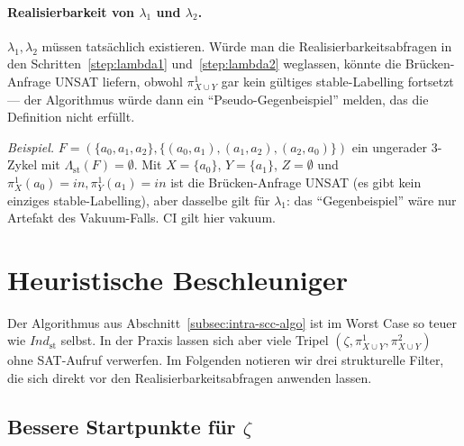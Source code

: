 \paragraph{Realisierbarkeit von \texorpdfstring{\(\lambda_1\)}{lambda_1} und \texorpdfstring{\(\lambda_2\)}{lambda_2}.}
\(\lambda_1, \lambda_2\) müssen tatsächlich existieren. Würde man die
Realisierbarkeitsabfragen in den Schritten~\ref{step:lambda1}
und~\ref{step:lambda2} weglassen, könnte die Brücken-Anfrage UNSAT
liefern, obwohl \(\pi^1_{X\cup Y}\) gar kein gültiges stable-Labelling
fortsetzt --- der Algorithmus würde dann ein ``Pseudo-Gegenbeispiel''
melden, das die Definition nicht erfüllt.

\emph{Beispiel.} \(F=(\{a_0, a_1, a_2\}, \{(a_0, a_1), (a_1, a_2),
(a_2, a_0)\})\) ein ungerader 3-Zykel mit
\(\varLambda_{\mathrm{st}}(F) = \emptyset\). Mit \(X=\{a_0\}\),
\(Y=\{a_1\}\), \(Z=\emptyset\) und \(\pi^1_X(a_0) = \mathit{in},
\pi^1_Y(a_1) = \mathit{in}\) ist die Brücken-Anfrage UNSAT (es gibt
kein einziges stable-Labelling), aber dasselbe gilt für \(\lambda_1\):
das ``Gegenbeispiel'' wäre nur Artefakt des Vakuum-Falls. CI gilt hier
vakuum.

\section{Heuristische Beschleuniger}
\label{sec:intra-scc-heur}

Der Algorithmus aus Abschnitt~\ref{subsec:intra-scc-algo} ist im
Worst Case so teuer wie \(\textit{Ind}_{\mathrm{st}}\) selbst. In der
Praxis lassen sich aber viele Tripel
\((\zeta, \pi^1_{X\cup Y}, \pi^2_{X\cup Y})\) ohne SAT-Aufruf
verwerfen. Im Folgenden notieren wir drei strukturelle Filter, die
sich direkt vor den Realisierbarkeitsabfragen anwenden lassen.

\subsection{Bessere Startpunkte für \texorpdfstring{\(\zeta\)}{zeta}}
\label{subsec:heur-z-pick}


